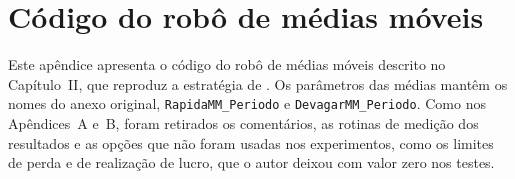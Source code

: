 \chapter{Código do robô de médias móveis}

Este apêndice apresenta o código do robô de médias móveis descrito no
Capítulo~II, que reproduz a estratégia de . Os
parâmetros das médias mantêm os nomes do anexo original,
\texttt{RapidaMM\_\allowbreak Periodo} e \texttt{DevagarMM\_\allowbreak Periodo}.
Como nos Apêndices~A e~B, foram retirados os comentários, as rotinas de medição
dos resultados e as opções que não foram usadas nos experimentos, como os
limites de perda e de realização de lucro, que o autor deixou com valor zero nos
testes.


